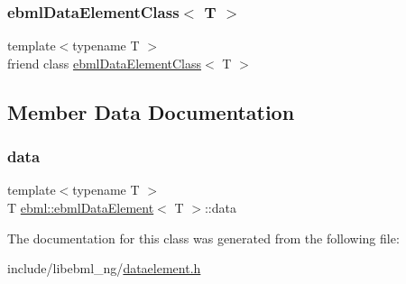 \subsubsection{\texorpdfstring{ebml\+Data\+Element\+Class$<$ T $>$}{ebmlDataElementClass< T >}}
{\footnotesize\ttfamily template$<$typename T $>$ \\
friend class \mbox{\hyperlink{classebml_1_1ebmlDataElementClass}{ebml\+Data\+Element\+Class}}$<$ T $>$\hspace{0.3cm}{\ttfamily [friend]}}



\subsection{Member Data Documentation}
\mbox{\label{classebml_1_1ebmlDataElement_aa0b68d39cf69e0a34ba7bb1d8368a386}} 
\subsubsection{\texorpdfstring{data}{data}}
{\footnotesize\ttfamily template$<$typename T $>$ \\
T \mbox{\hyperlink{classebml_1_1ebmlDataElement}{ebml\+::ebml\+Data\+Element}}$<$ T $>$\+::data}



The documentation for this class was generated from the following file\+:\begin{DoxyCompactItemize}
\item 
include/libebml\+\_\+ng/\mbox{\hyperlink{dataelement_8h}{dataelement.\+h}}\end{DoxyCompactItemize}
